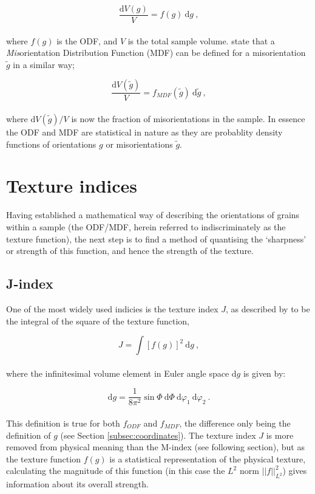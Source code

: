 \documentclass[a4paper,12pt,twoside]{report}
\numberwithin{equation}{chapter}
\begin{document}
\begin{equation}
\frac{\mathrm{d}V(g)}{V} = f(g)\ \mathrm{d}g\ ,
\end{equation}
\\
where $f(g)$ is the ODF, and $V$ is the total sample volume. \cite{Mainprice} state that a \emph{Mis}orientation Distribution Function (MDF) can be defined for a misorientation $\tilde{g}$ in a similar way;




\begin{equation}
\frac{\mathrm{d}V(\tilde{g})}{V} = f_{MDF}(\tilde{g})\ \mathrm{d}\tilde{g}\ ,
\end{equation}
\\
where $\mathrm{d}V(\tilde{g})/V$ is now the fraction of misorientations in the sample. In essence the ODF and MDF are statistical in nature as they are probablity density functions of orientations $g$ or misorientations $\tilde{g}$. 


\section{Texture indices} \label{sec:indicies}
Having established a mathematical way of describing the orientations of grains within a sample (the ODF/MDF, herein referred to indiscriminately as the texture function), the next step is to find a method of quantising the \lq{}sharpness\rq{} or strength of this function, and hence the strength of the texture.

\subsection{J-index} \label{subsec:j-index}
 One of the most widely used indicies is the texture index $J$, as described by \cite{bunge1982texture} to be the integral of the square of the texture function,

\begin{equation}
J = \int [ f(g) ]^2\ \mathrm{d}g \ ,
\end{equation} 
\\
where the infinitesimal volume element in Euler angle space $\mathrm{d}g$ is given by:

\begin{equation}
\mathrm{d}g = \frac{1}{8\pi^2} \sin\Phi\ \mathrm{d}\Phi\ \mathrm{d}\varphi_1\ \mathrm{d}\varphi_2\ .
\end{equation} 
\\
This definition is true for both $f_{ODF}$ and $f_{MDF}$, the difference only being the definition of $g$ (see Section \ref{subsec:coordinates}). The texture index $J$ is more removed from physical meaning than the M-index (see following section), but as the texture function $f(g)$ is a statistical representation of the physical texture, calculating the magnitude of this function (in this case the $L^2$ norm $||f||^2_{L^2}$) gives information about its overall strength.
\end{document}
